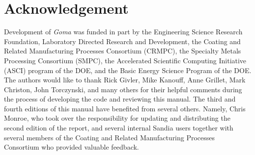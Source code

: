 \chapter*{Acknowledgement}
%
Development of \emph{Goma} was funded in part by the Engineering Science Research Foundation,
Laboratory Directed Research and Development, the Coating and Related Manufacturing
Processes Consortium (CRMPC), the Specialty Metals Processing Consortium (SMPC), the
Accelerated Scientific Computing Initiative (ASCI) program of the DOE, and the Basic Energy
Science Program of the DOE. The authors would like to thank Rick Givler, Mike Kanouff, Anne
Grillet, Mark Christon, John Torczynski, and many others for their helpful comments during the
process of developing the code and reviewing this manual. The third and fourth editions of this
manual have benefited from several others. Namely, Chris Monroe, who took over the
responsibility for updating and distributing the second edition of the report, and several internal
Sandia users together with several members of the Coating and Related Manufacturing Processes Consortium who provided valuable feedback.
%
\newpage
{}
{}
\tableofcontents
%
%
\newpage
{}
{}
\listoffigures
%
%
\newpage
{}
{}
\listoftables
%